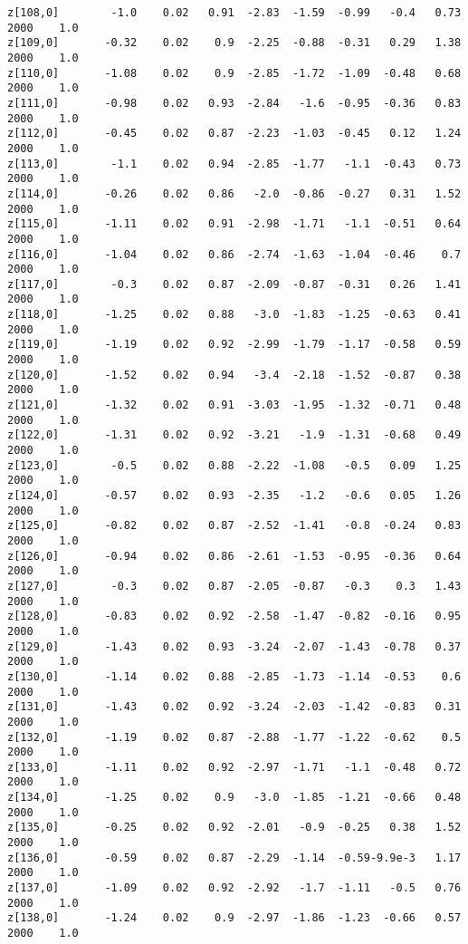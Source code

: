 \documentclass[11pt]{article}
\begin{document}
\begin{Verbatim}[commandchars=\\\{\}]
z[108,0]        -1.0    0.02   0.91  -2.83  -1.59  -0.99   -0.4   0.73   2000    1.0
z[109,0]       -0.32    0.02    0.9  -2.25  -0.88  -0.31   0.29   1.38   2000    1.0
z[110,0]       -1.08    0.02    0.9  -2.85  -1.72  -1.09  -0.48   0.68   2000    1.0
z[111,0]       -0.98    0.02   0.93  -2.84   -1.6  -0.95  -0.36   0.83   2000    1.0
z[112,0]       -0.45    0.02   0.87  -2.23  -1.03  -0.45   0.12   1.24   2000    1.0
z[113,0]        -1.1    0.02   0.94  -2.85  -1.77   -1.1  -0.43   0.73   2000    1.0
z[114,0]       -0.26    0.02   0.86   -2.0  -0.86  -0.27   0.31   1.52   2000    1.0
z[115,0]       -1.11    0.02   0.91  -2.98  -1.71   -1.1  -0.51   0.64   2000    1.0
z[116,0]       -1.04    0.02   0.86  -2.74  -1.63  -1.04  -0.46    0.7   2000    1.0
z[117,0]        -0.3    0.02   0.87  -2.09  -0.87  -0.31   0.26   1.41   2000    1.0
z[118,0]       -1.25    0.02   0.88   -3.0  -1.83  -1.25  -0.63   0.41   2000    1.0
z[119,0]       -1.19    0.02   0.92  -2.99  -1.79  -1.17  -0.58   0.59   2000    1.0
z[120,0]       -1.52    0.02   0.94   -3.4  -2.18  -1.52  -0.87   0.38   2000    1.0
z[121,0]       -1.32    0.02   0.91  -3.03  -1.95  -1.32  -0.71   0.48   2000    1.0
z[122,0]       -1.31    0.02   0.92  -3.21   -1.9  -1.31  -0.68   0.49   2000    1.0
z[123,0]        -0.5    0.02   0.88  -2.22  -1.08   -0.5   0.09   1.25   2000    1.0
z[124,0]       -0.57    0.02   0.93  -2.35   -1.2   -0.6   0.05   1.26   2000    1.0
z[125,0]       -0.82    0.02   0.87  -2.52  -1.41   -0.8  -0.24   0.83   2000    1.0
z[126,0]       -0.94    0.02   0.86  -2.61  -1.53  -0.95  -0.36   0.64   2000    1.0
z[127,0]        -0.3    0.02   0.87  -2.05  -0.87   -0.3    0.3   1.43   2000    1.0
z[128,0]       -0.83    0.02   0.92  -2.58  -1.47  -0.82  -0.16   0.95   2000    1.0
z[129,0]       -1.43    0.02   0.93  -3.24  -2.07  -1.43  -0.78   0.37   2000    1.0
z[130,0]       -1.14    0.02   0.88  -2.85  -1.73  -1.14  -0.53    0.6   2000    1.0
z[131,0]       -1.43    0.02   0.92  -3.24  -2.03  -1.42  -0.83   0.31   2000    1.0
z[132,0]       -1.19    0.02   0.87  -2.88  -1.77  -1.22  -0.62    0.5   2000    1.0
z[133,0]       -1.11    0.02   0.92  -2.97  -1.71   -1.1  -0.48   0.72   2000    1.0
z[134,0]       -1.25    0.02    0.9   -3.0  -1.85  -1.21  -0.66   0.48   2000    1.0
z[135,0]       -0.25    0.02   0.92  -2.01   -0.9  -0.25   0.38   1.52   2000    1.0
z[136,0]       -0.59    0.02   0.87  -2.29  -1.14  -0.59-9.9e-3   1.17   2000    1.0
z[137,0]       -1.09    0.02   0.92  -2.92   -1.7  -1.11   -0.5   0.76   2000    1.0
z[138,0]       -1.24    0.02    0.9  -2.97  -1.86  -1.23  -0.66   0.57   2000    1.0

\end{Verbatim}
\end{document}
